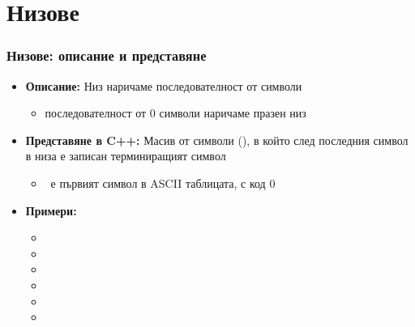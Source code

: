 \documentclass[alsotrans]{beamerswitch}
\begin{document}
\section{Низове}

\begin{frame}
  \frametitle{Низове: описание и представяне}

  \begin{itemize}[<+->]
  \item \textbf{Описание:} \alert{Низ} наричаме последователност от символи
    \begin{itemize}
    \item последователност от 0 символи наричаме \alert{празен низ}
    \end{itemize}
  \item \textbf{Представяне в C++:} Масив от символи (), в който след последния символ в низа е записан \alert{терминиращият символ} \term
    \begin{itemize}
    \item \term\ е първият символ в ASCII таблицата, с код 0
    \end{itemize}
  \item \textbf{Примери:}
    \begin{itemize}
    \item {}
    \item {}
    \item {}
    \item {}
    \item {}
    \item {}
    \end{itemize}
  \end{itemize}
\end{frame}
\end{document}
